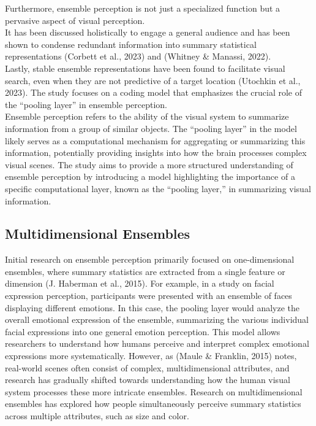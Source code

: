 \documentclass[print]{nuthesis}
\begin{document}
Furthermore, ensemble perception is not just a specialized function but a pervasive aspect of visual perception.\\
It has been discussed holistically to engage a general audience and has been shown to condense redundant information into summary statistical representations (Corbett et al., 2023) and (Whitney \& Manassi, 2022).\\
Lastly, stable ensemble representations have been found to facilitate visual search, even when they are not predictive of a target location (Utochkin et al., 2023).
The study focuses on a coding model that emphasizes the crucial role of the ``pooling layer'' in ensemble perception.\\
Ensemble perception refers to the ability of the visual system to summarize information from a group of similar objects.
The ``pooling layer'' in the model likely serves as a computational mechanism for aggregating or summarizing this information, potentially providing insights into how the brain processes complex visual scenes.
The study aims to provide a more structured understanding of ensemble perception by introducing a model highlighting the importance of a specific computational layer, known as the ``pooling layer,'' in summarizing visual information.

\hypertarget{multidimensional-ensembles-1}{%
\subsection{Multidimensional Ensembles}\label{multidimensional-ensembles-1}}

Initial research on ensemble perception primarily focused on one-dimensional ensembles, where summary statistics are extracted from a single feature or dimension (J. Haberman et al., 2015).
For example, in a study on facial expression perception, participants were presented with an ensemble of faces displaying different emotions.
In this case, the pooling layer would analyze the overall emotional expression of the ensemble, summarizing the various individual facial expressions into one general emotion perception.
This model allows researchers to understand how humans perceive and interpret complex emotional expressions more systematically.
However, as (Maule \& Franklin, 2015) notes, real-world scenes often consist of complex, multidimensional attributes, and research has gradually shifted towards understanding how the human visual system processes these more intricate ensembles.
Research on multidimensional ensembles has explored how people simultaneously perceive summary statistics across multiple attributes, such as size and color.
\end{document}
